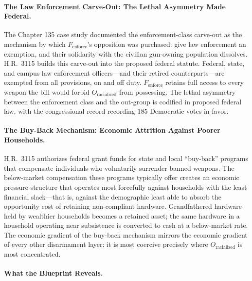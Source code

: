 \paragraph{The Law Enforcement Carve-Out: The Lethal Asymmetry Made Federal.}

The Chapter 135 case study documented the enforcement-class carve-out as the mechanism by which $F_{\text{enforce}}$'s opposition was purchased: give law enforcement an exemption, and their solidarity with the civilian gun-owning population dissolves. H.R.\ 3115 builds this carve-out into the proposed federal statute. Federal, state, and campus law enforcement officers---and their retired counterparts---are exempted from all provisions, on and off duty. $F_{\text{enforce}}$ retains full access to every weapon the bill would forbid $O_{\text{racialized}}$ from possessing. The lethal asymmetry between the enforcement class and the out-group is codified in proposed federal law, with the congressional record recording 185 Democratic votes in favor.

\paragraph{The Buy-Back Mechanism: Economic Attrition Against Poorer Households.}

H.R.\ 3115 authorizes federal grant funds for state and local ``buy-back'' programs that compensate individuals who voluntarily surrender banned weapons. The below-market compensation these programs typically offer creates an economic pressure structure that operates most forcefully against households with the least financial slack---that is, against the demographic least able to absorb the opportunity cost of retaining non-compliant hardware. Grandfathered hardware held by wealthier households becomes a retained asset; the same hardware in a household operating near subsistence is converted to cash at a below-market rate. The economic gradient of the buy-back mechanism mirrors the economic gradient of every other disarmament layer: it is most coercive precisely where $O_{\text{racialized}}$ is most concentrated.

\paragraph{What the Blueprint Reveals.}

